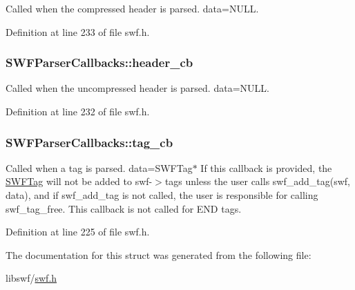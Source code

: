 Called when the compressed header is parsed. data=N\+U\+L\+L. 



Definition at line 233 of file swf.\+h.

\hypertarget{struct_s_w_f_parser_callbacks_a894666f68df70f79b7b2bed33cccf498}{}
\subsubsection[{header\+\_\+cb}]{ S\+W\+F\+Parser\+Callbacks\+::header\+\_\+cb}\label{struct_s_w_f_parser_callbacks_a894666f68df70f79b7b2bed33cccf498}


Called when the uncompressed header is parsed. data=N\+U\+L\+L. 



Definition at line 232 of file swf.\+h.

\hypertarget{struct_s_w_f_parser_callbacks_a898af2d0db9d2d038e4d9c039ea91ac2}{}
\subsubsection[{tag\+\_\+cb}]{ S\+W\+F\+Parser\+Callbacks\+::tag\+\_\+cb}\label{struct_s_w_f_parser_callbacks_a898af2d0db9d2d038e4d9c039ea91ac2}
Called when a tag is parsed. data=S\+W\+F\+Tag$\ast$ If this callback is provided, the \hyperlink{struct_s_w_f_tag}{S\+W\+F\+Tag} will not be added to swf-\/$>$tags unless the user calls swf\+\_\+add\+\_\+tag(swf, data), and if swf\+\_\+add\+\_\+tag is not called, the user is responsible for calling swf\+\_\+tag\+\_\+free. This callback is not called for E\+N\+D tags. 

Definition at line 225 of file swf.\+h.



The documentation for this struct was generated from the following file\+:\begin{DoxyCompactItemize}
\item 
libswf/\hyperlink{swf_8h}{swf.\+h}\end{DoxyCompactItemize}
